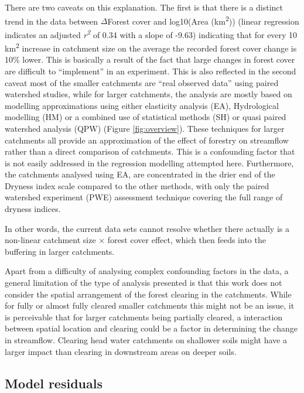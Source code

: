 \documentclass[]{elsarticle} %
\begin{document}
There are two caveats on this explanation. The first is that there is a distinct trend in the data between \(\Delta\)Forest cover and log10(Area (km\textsuperscript{2})) (linear regression indicates an adjusted \emph{r\textsuperscript{2}} of 0.34 with a slope of -9.63) indicating that for every 10 km\textsuperscript{2} increase in catchment size on the average the recorded forest cover change is 10\% lower. This is basically a result of the fact that large changes in forest cover are difficult to ``implement'' in an experiment.
This is also reflected in the second caveat most of the smaller catchments are ``real observed data'' using paired watershed studies, while for larger catchments, the analysis are mostly based on modelling approximations using either elasticity analysis (EA), Hydrological modelling (HM) or a combined use of statistical methods (SH) or quasi paired watershed analysis (QPW) (Figure \ref{fig:overview}). These techniques for larger catchments all provide an approximation of the effect of forestry on streamflow rather than a direct comparison of catchments. This is a confounding factor that is not easily addressed in the regression modelling attempted here. Furthermore, the catchments analysed using EA, are concentrated in the drier end of the Dryness index scale compared to the other methods, with only the paired watershed experiment (PWE) assessment technique covering the full range of dryness indices.

In other words, the current data sets cannot resolve whether there actually is a non-linear catchment size × forest cover effect, which then feeds into the buffering in larger catchments.

Apart from a difficulty of analysing complex confounding factors in the data, a general limitation of the type of analysis presented is that this work does not consider the spatial arrangement of the forest clearing in the catchments. While for fully or almost fully cleared smaller catchments this might not be an issue, it is perceivable that for larger catchments being partially cleared, a interaction between spatial location and clearing could be a factor in determining the change in streamflow. Clearing head water catchments on shallower soils might have a larger impact than clearing in downstream areas on deeper soils.

\hypertarget{model-residuals}{%
\subsection{Model residuals}\label{model-residuals}}
\end{document}
